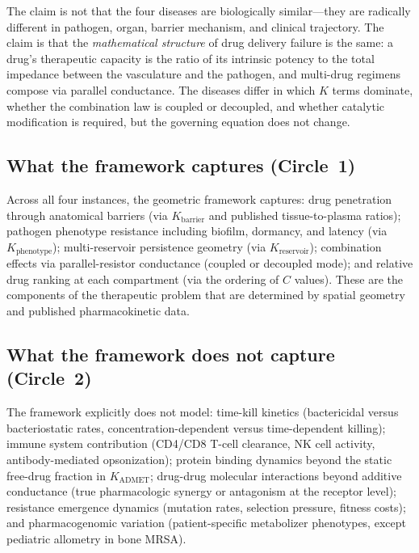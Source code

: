 \documentclass[11pt]{article}
\theoremstyle{plain}
\theoremstyle{definition}
\newcommand{\Kbarr}{K_{\mathrm{barrier}}}
\newcommand{\Kpheno}{K_{\mathrm{phenotype}}}
\newcommand{\Kres}{K_{\mathrm{reservoir}}}
\newcommand{\Kadmet}{K_{\mathrm{ADMET}}}
\begin{document}
The claim is not that the four diseases are biologically similar---they
are radically different in pathogen, organ, barrier mechanism, and
clinical trajectory. The claim is that the \emph{mathematical
structure} of drug delivery failure is the same: a drug's
therapeutic capacity is the ratio of its intrinsic potency to the
total impedance between the vasculature and the pathogen, and
multi-drug regimens compose via parallel conductance. The diseases
differ in which $K$ terms dominate, whether the combination law is
coupled or decoupled, and whether catalytic modification is
required, but the governing equation does not change.

\subsection{What the framework captures (Circle~1)}
\label{sec:circle1}

Across all four instances, the geometric framework captures:
drug penetration through anatomical barriers (via $\Kbarr$ and
published tissue-to-plasma ratios); pathogen phenotype resistance
including biofilm, dormancy, and latency (via $\Kpheno$);
multi-reservoir persistence geometry (via $\Kres$); combination
effects via parallel-resistor conductance (coupled or decoupled
mode); and relative drug ranking at each compartment (via the
ordering of $C$ values). These are the components of the
therapeutic problem that are determined by spatial geometry and
published pharmacokinetic data.

\subsection{What the framework does not capture (Circle~2)}
\label{sec:circle2}

The framework explicitly does not model:
time-kill kinetics (bactericidal versus bacteriostatic rates,
concentration-dependent versus time-dependent killing);
immune system contribution (CD4/CD8 T-cell clearance, NK cell
activity, antibody-mediated opsonization);
protein binding dynamics beyond the static free-drug fraction in
$\Kadmet$;
drug-drug molecular interactions beyond additive conductance
(true pharmacologic synergy or antagonism at the receptor level);
resistance emergence dynamics (mutation rates, selection pressure,
fitness costs); and
pharmacogenomic variation (patient-specific metabolizer phenotypes,
except pediatric allometry in bone MRSA).
\end{document}

